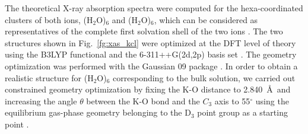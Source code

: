 
The theoretical X-ray absorption spectra were computed for the hexa-coordinated clusters of both ions, \ki(H$_2$O)$_6$ and \cli(H$_2$O)$_6$, which can be considered as representatives of the complete first solvation shell of the two ions \citep{Ohtaki93:1157,soper06:180,ma14:1006}. The two structures shown in Fig.\ \ref{fg:xas_kcl} were optimized at the DFT level of theory using the B3LYP functional and the 6-311++G(2d,2p) basis set \citep{Krishnan80:650,Blaudeau97:5016}. The geometry optimization was performed with the Gaussian 09 package \citep{g09}. In order to obtain a realistic structure for \ki(H$_2$O)$_6$ corresponding to the bulk solution, we carried out constrained geometry optimization by fixing the K-O distance to 2.840~\AA~and increasing the angle $\theta$ between the K-O bond and the $C_3$ axis to 55$^{\circ}$ using the equilibrium gas-phase geometry belonging to the D$_3$ point group as a starting point \citep{lee99:3995,lee02:5509}.

